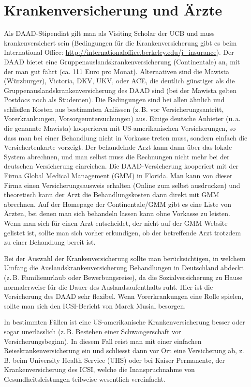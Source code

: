 \documentclass[a4paper]{scrreprt}
\begin{document}
\section{Krankenversicherung und Ärzte}

Als DAAD-Stipendiat gilt man als Visiting Scholar der UCB und muss krankenversichert sein (Bedingungen für die Krankenversicherung gibt es beim International Office:  \url{http://internationaloffice.berkeley.edu/j\_insurance}). Der DAAD bietet eine Gruppenauslandskrankenversicherung (Continentale) an, mit der man gut fährt (ca. 111 Euro pro Monat). Alternativen sind die Mawista (Würzburger), Victoria, DKV, UKV, oder ACE, die deutlich günstiger als die Gruppenauslandskrankenversicherung des DAAD sind (bei der Mawista gelten Postdocs noch als Studenten). Die Bedingungen sind bei allen ähnlich und schließen Kosten aus bestimmten Anlässen (z.\,B. vor Versicherungsantritt, Vorerkrankungen, Vorsorgeuntersuchungen) aus. Einige deutsche Anbieter (u.\,a. die genannte Mawista) kooperieren mit US-amerikanischen Versicherungen, so dass man bei einer Behandlung nicht in Vorkasse treten muss, sondern einfach die Versichertenkarte vorzeigt. Der behandelnde Arzt kann dann über das lokale System abrechnen, und man selbst muss die Rechnungen nicht mehr bei der deutschen Versicherung einreichen. Die DAAD-Versicherung kooperiert mit der Firma Global Medical Management (GMM) in Florida. Man kann von dieser Firma einen Versicherungsausweis erhalten (Online zum selbst ausdrucken) und theoretisch kann der Arzt die Behandlungskosten dann direkt mit GMM abrechnen. Auf der Homepage der Continentale/GMM gibt es eine Liste von Ärzten, bei denen man sich behandeln lassen kann ohne Vorkasse zu leisten.
Wenn man sich für einen Arzt entscheidet, der nicht auf der GMM-Website gelistet ist, sollte man sich vorher erkundigen, ob der betreffende Arzt trotzdem zu einer Behandlung bereit ist.

Bei der Auswahl der Krankenversicherung sollte man berücksichtigen, in welchem Umfang die Auslandskrankenversicherung Behandlungen in Deutschland abdeckt (z.\,B. Familienurlaub oder Bewerbungsreise), da die Sozialversicherung zu Hause normalerweise für die Dauer des Auslandsaufenthalts ruht. Hier ist die Versicherung des DAAD sehr flexibel. Wenn Vorerkrankungen eine Rolle spielen, sollte man sich den ICSI-Bericht von Marek Musial besorgen.

In bestimmten Fällen ist eine US-amerikanische Krankenversicherung besser oder sogar unerlässlich (z.\,B. Bestehen einer Schwangerschaft vor Versicherungsbeginn). In diesem Fall reist man mit einer einfachen Reisekrankenversicherung ein und schliesst dann vor Ort eine Versicherung ab, z.\,B. beim University Health Service (UHS) oder bei Kaiser Permanente, der Krankenversicherung des ICSI, welche die Inanspruchnahme von Gesundheitsleistungen teilweise wesentlich vereinfacht.
\end{document}
